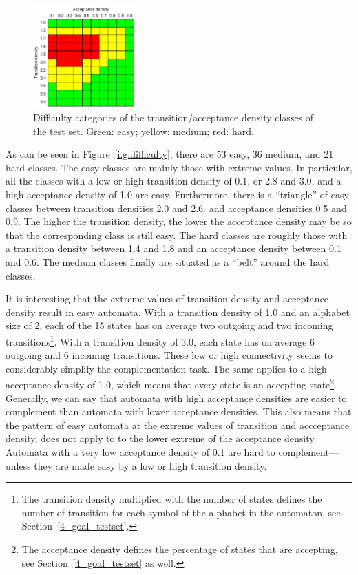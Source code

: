 \begin{figure}[ht]
\centering
\includegraphics[width=0.35\textwidth]{figures/r/internal/goal/difficulty.pdf}
\caption{Difficulty categories of the transition/acceptance density classes of the \goal{} test set. Green: easy; yellow: medium; red: hard.}
\end{figure}

As can be seen in Figure~\ref{i.g.difficulty}, there are 53 easy, 36 medium, and 21 hard classes. The easy classes are mainly those with extreme values. In particular, all the classes with a low or high transition density of 0.1, or 2.8 and 3.0, and a high acceptance density of 1.0 are easy. Furthermore, there is a ``triangle'' of easy classes between transition densities 2.0 and 2.6. and acceptance densities 0.5 and 0.9. The higher the transition density, the lower the acceptance density may be so that the corresponding class is still easy. The hard classes are roughly those with a transition density between 1.4 and 1.8 and an acceptance density between 0.1 and 0.6. The medium classes finally are situated as a ``belt'' around the hard classes.

It is interesting that the extreme values of transition density and acceptance density result in easy automata. With a transition density of 1.0 and an alphabet size of 2, each of the 15 states has on average two outgoing and two incoming transitions\footnote{The transition density multiplied with the number of states defines the number of transition for each symbol of the alphabet in the automaton, see Section~\ref{4_goal_testset}.}. With a transition density of 3.0, each state has on average 6 outgoing and 6 incoming transitions. These low or high connectivity seems to considerably simplify the complementation task. The same applies to a high acceptance density of 1.0, which means that every state is an accepting state\footnote{The acceptance density defines the percentage of states that are accepting, see Section~\ref{4_goal_testset} as well.}. Generally, we can say that automata with high acceptance densities are easier to complement than automata with lower acceptance densities. This also means that the pattern of easy automata at the extreme values of transition and accceptance density, does not apply to to the lower extreme of the acceptance density. Automata with a very low acceptance density of 0.1 are hard to complement---unless they are made easy by a low or high transition density.

